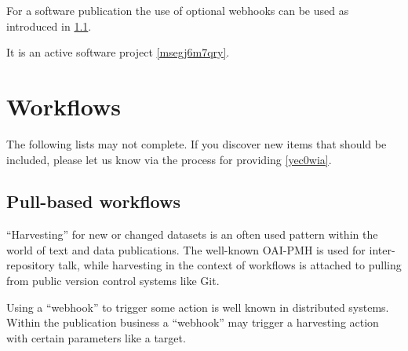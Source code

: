 \documentclass{article}
\begin{document}
For a software publication the use of optional webhooks can be used as introduced in \ref{dttj6h7jn6f}.

It is an active software project \ref{msegj6m7qry}.



\section{Workflows}\label{bq4pinu53a8}
The following lists may not complete. If you discover new items that should be included, please let us know via the process for providing \ref{yec0wia}.



\subsection{Pull-based workflows}\label{dttj6h7jn6f}
“Harvesting” for new or changed datasets is an often used pattern within the world of text and data publications. The well-known OAI-PMH is used for inter-repository talk, while harvesting in the context of workflows is attached to pulling from public version control systems like Git.

Using a “webhook” to trigger some action is well known in distributed systems. Within the publication business a “webhook” may trigger a harvesting action with certain parameters like a target.
\end{document}
